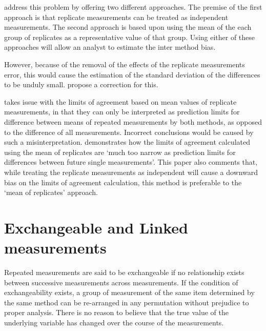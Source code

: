 \documentclass[12pt, a4paper]{report}
\theoremstyle{plain}
\theoremstyle{definition}
\theoremstyle{remark}
\begin{document}
	\citet*{BA86} address this problem by offering two different
	approaches. The premise of the first approach is that replicate
	measurements can be treated as independent measurements. The
	second approach is based upon using the mean of the each group of
	replicates as a representative value of that group. Using either
	of these approaches will allow an analyst to estimate the inter
	method bias.
	
	
	However, because of the removal of the effects of the replicate
	measurements error, this would cause the estimation of the
	standard deviation of the differences to be unduly small.
	\citet*{BA86} propose a correction for this.
	
	\citet{BXC2008} takes issue with the limits of agreement based on
	mean values of replicate measurements, in that they can only be interpreted as prediction
	limits for difference between means of repeated measurements by
	both methods, as opposed to the difference of all measurements.
	Incorrect conclusions would be caused by such a misinterpretation.
	\citet{BXC2008} demonstrates how the limits of agreement
	calculated using the mean of replicates are `much too narrow as
	prediction limits for differences between future single
	measurements'. This paper also comments that, while treating the
	replicate measurements as independent will cause a downward bias
	on the limits of agreement calculation, this method is preferable
	to the `mean of replicates' approach.
	
	
	
	
	
	
	
	

	\section{Exchangeable and Linked measurements}
	
	
	Repeated measurements are said to be exchangeable if no relationship exists between successive measurements across measurements. If the condition of exchangeability exists, a group of measurement of the same item determined by the same method can be re-arranged in any permutation without prejudice to proper analysis. There is no reason to believe that the true value of the underlying variable has changed over the course of the measurements.
	
\end{document}
